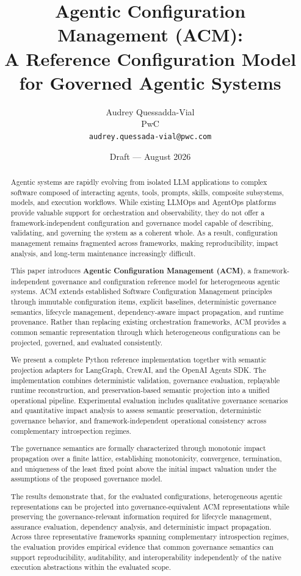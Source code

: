 \documentclass[10pt]{article}
\title{\textbf{Agentic Configuration Management (ACM):\\A Reference Configuration Model for Governed Agentic Systems}}
\author{
  Audrey Quessadda-Vial\\
  PwC\\
  \texttt{audrey.quessada-vial@pwc.com}
}
\date{Draft --- August 2026}
\begin{document}
\maketitle

\begin{abstract}

Agentic systems are rapidly evolving from isolated LLM applications to complex software composed of interacting agents, tools, prompts, skills, composite subsystems, models, and execution workflows. While existing LLMOps and AgentOps platforms provide valuable support for orchestration and observability, they do not offer a framework-independent configuration and governance model capable of describing, validating, and governing the system as a coherent whole. As a result, configuration management remains fragmented across frameworks, making reproducibility, impact analysis, and long-term maintenance increasingly difficult.

This paper introduces \textbf{Agentic Configuration Management (ACM)}, a framework-independent governance and configuration reference model for heterogeneous agentic systems. ACM extends established Software Configuration Management principles through immutable configuration items, explicit baselines, deterministic governance semantics, lifecycle management, dependency-aware impact propagation, and runtime provenance. Rather than replacing existing orchestration frameworks, ACM provides a common semantic representation through which heterogeneous configurations can be projected, governed, and evaluated consistently.

We present a complete Python reference implementation together with semantic projection adapters for LangGraph, CrewAI, and the OpenAI Agents SDK. The implementation combines deterministic validation, governance evaluation, replayable runtime reconstruction, and preservation-based semantic projection into a unified operational pipeline. Experimental evaluation includes qualitative governance scenarios and quantitative impact analysis to assess semantic preservation, deterministic governance behavior, and framework-independent operational consistency across complementary introspection regimes.

The governance semantics are formally characterized through monotonic impact propagation over a finite lattice, establishing monotonicity, convergence, termination, and uniqueness of the least fixed point above the initial impact valuation under the assumptions of the proposed governance model.

The results demonstrate that, for the evaluated configurations, heterogeneous agentic representations can be projected into governance-equivalent ACM representations while preserving the governance-relevant information required for lifecycle management, assurance evaluation, dependency analysis, and deterministic impact propagation. Across three representative frameworks spanning complementary introspection regimes, the evaluation provides empirical evidence that common governance semantics can support reproducibility, auditability, and interoperability independently of the native execution abstractions within the evaluated scope.

\end{abstract}
\end{document}
